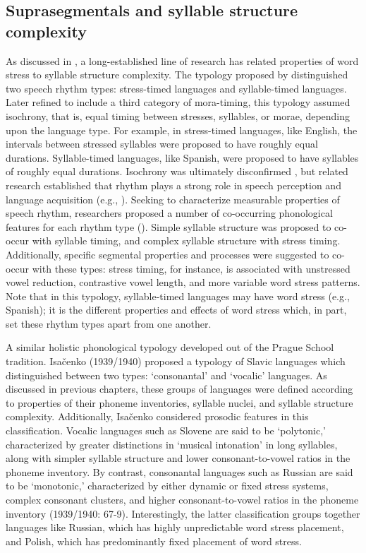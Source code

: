 \subsection{Suprasegmentals and syllable structure complexity}\label{sec:5.1.2}

  As discussed in , a long-established line of research has related properties of word stress to syllable structure complexity. The typology proposed by \citet{Pike1945} distinguished two speech rhythm types: stress-timed languages and syllable-timed languages. Later refined to include a third category of mora-timing, this typology assumed isochrony, that is, equal timing between stresses, syllables, or morae, depending upon the language type. For example, in stress-timed languages, like English, the intervals between stressed syllables were proposed to have roughly equal durations. Syllable-timed languages, like Spanish, were proposed to have syllables of roughly equal durations. Isochrony was ultimately disconfirmed \citep{Roach1982}, but related research established that rhythm plays a strong role in speech perception and language acquisition (e.g., \citealt{CutlerMehler1993}). Seeking to characterize measurable properties of speech rhythm, researchers proposed a number of co-occurring phonological features for each rhythm type (\citealt{Dauer1983,Auer1993}). Simple syllable structure was proposed to co-occur with syllable timing, and complex syllable structure with stress timing. Additionally, specific segmental properties and processes were suggested to co-occur with these types: stress timing, for instance, is associated with unstressed vowel reduction, contrastive vowel length, and more variable word stress patterns. Note that in this typology, syllable-timed languages may have word stress (e.g., Spanish); it is the different properties and effects of word stress which, in part, set these rhythm types apart from one another.

  A similar holistic phonological typology developed out of the Prague School tradition. Isačenko (1939/1940) proposed a typology of Slavic languages which distinguished between two types: ‘consonantal’ and ‘vocalic’ languages. As discussed in previous chapters, these groups of languages were defined according to properties of their phoneme inventories, syllable nuclei, and syllable structure complexity. Additionally, Isačenko considered prosodic features in this classification. Vocalic languages such as Slovene are said to be ‘polytonic,’ characterized by greater distinctions in ‘musical intonation’ in long syllables, along with simpler syllable structure and lower consonant-to-vowel ratios in the phoneme inventory. By contrast, consonantal languages such as Russian are said to be ‘monotonic,’ characterized by either dynamic or fixed stress systems, complex consonant clusters, and higher consonant-to-vowel ratios in the phoneme inventory (1939/1940: 67-9). Interestingly, the latter classification groups together languages like Russian, which has highly unpredictable word stress placement, and Polish, which has predominantly fixed placement of word stress.

